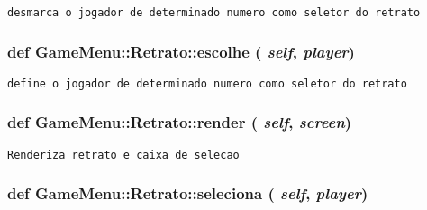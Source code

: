 \begin{footnotesize}\begin{verbatim}desmarca o jogador de determinado numero como seletor do retrato \end{verbatim}
\end{footnotesize}
 \hypertarget{class_game_menu_1_1_retrato_71b7d02732274b0bf496bb66f02f07f5}{
\subsubsection[{escolhe}]{\setlength{\rightskip}{0pt plus 5cm}def GameMenu::Retrato::escolhe ( {\em self}, \/   {\em player})}}
\label{class_game_menu_1_1_retrato_71b7d02732274b0bf496bb66f02f07f5}




\begin{footnotesize}\begin{verbatim}define o jogador de determinado numero como seletor do retrato \end{verbatim}
\end{footnotesize}
 \hypertarget{class_game_menu_1_1_retrato_774994780cf72f28f4e7de593df60f51}{
\subsubsection[{render}]{\setlength{\rightskip}{0pt plus 5cm}def GameMenu::Retrato::render ( {\em self}, \/   {\em screen})}}
\label{class_game_menu_1_1_retrato_774994780cf72f28f4e7de593df60f51}




\begin{footnotesize}\begin{verbatim}Renderiza retrato e caixa de selecao \end{verbatim}
\end{footnotesize}
 \hypertarget{class_game_menu_1_1_retrato_b1d60082873cd5f984602edf3ea9c6b3}{
\subsubsection[{seleciona}]{\setlength{\rightskip}{0pt plus 5cm}def GameMenu::Retrato::seleciona ( {\em self}, \/   {\em player})}}
\label{class_game_menu_1_1_retrato_b1d60082873cd5f984602edf3ea9c6b3}




